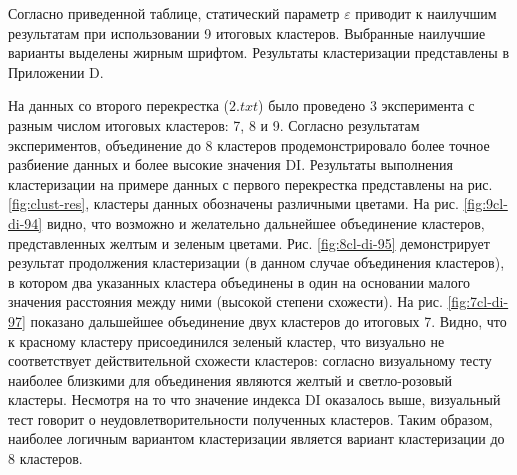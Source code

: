Согласно приведенной таблице, статический параметр $\varepsilon$ приводит к наилучшим результатам при использовании 9 итоговых кластеров. Выбранные наилучшие варианты выделены жирным шрифтом. Результаты кластеризации представлены в Приложении D.

На данных со второго перекрестка ($2.txt$) было проведено 3 эксперимента с разным числом итоговых кластеров: 7, 8 и 9. Согласно результатам экспериментов, объединение до 8 кластеров продемонстрировало более точное разбиение данных и более высокие значения DI. Результаты выполнения кластеризации на примере данных с первого перекрестка представлены на рис. \ref{fig:clust-res}, кластеры данных обозначены различными цветами. На рис. \ref{fig:9cl-di-94} видно, что возможно и желательно дальнейшее объединение кластеров, представленных желтым и зеленым цветами. Рис. \ref{fig:8cl-di-95} демонстрирует результат продолжения кластеризации (в данном случае объединения кластеров), в котором два указанных кластера объединены в один на основании малого значения расстояния между ними (высокой степени схожести). На рис. \ref{fig:7cl-di-97} показано дальшейшее объединение двух кластеров до итоговых 7. Видно, что к красному кластеру присоединился зеленый кластер, что визуально не соответствует действительной схожести кластеров: согласно визуальному тесту наиболее близкими для объединения являются желтый и светло-розовый кластеры. Несмотря на то что значение индекса DI оказалось выше, визуальный тест говорит о неудовлетворительности полученных кластеров. Таким образом, наиболее логичным вариантом кластеризации является вариант кластеризации до 8 кластеров. 

